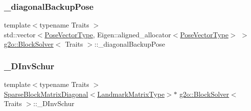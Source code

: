\mbox{\label{classg2o_1_1_block_solver_a3cb6f86c522c2ea26478ad44b7c32f76}} 
\subsubsection{\texorpdfstring{\+\_\+diagonal\+Backup\+Pose}{\_diagonalBackupPose}}
{\footnotesize\ttfamily template$<$typename Traits $>$ \\
std\+::vector$<$\mbox{\hyperlink{classg2o_1_1_block_solver_a65d51b9281e2e2597df05eb00801ee76}{Pose\+Vector\+Type}}, Eigen\+::aligned\+\_\+allocator$<$\mbox{\hyperlink{classg2o_1_1_block_solver_a65d51b9281e2e2597df05eb00801ee76}{Pose\+Vector\+Type}}$>$ $>$ \mbox{\hyperlink{classg2o_1_1_block_solver}{g2o\+::\+Block\+Solver}}$<$ Traits $>$\+::\+\_\+diagonal\+Backup\+Pose\hspace{0.3cm}{\ttfamily [protected]}}

\mbox{\label{classg2o_1_1_block_solver_ad6a1a8f17c8fb854962a8204c79bc981}} 
\subsubsection{\texorpdfstring{\+\_\+\+D\+Inv\+Schur}{\_DInvSchur}}
{\footnotesize\ttfamily template$<$typename Traits $>$ \\
\mbox{\hyperlink{classg2o_1_1_sparse_block_matrix_diagonal}{Sparse\+Block\+Matrix\+Diagonal}}$<$\mbox{\hyperlink{classg2o_1_1_block_solver_afd898a666343291129d37a979e23ded6}{Landmark\+Matrix\+Type}}$>$$\ast$ \mbox{\hyperlink{classg2o_1_1_block_solver}{g2o\+::\+Block\+Solver}}$<$ Traits $>$\+::\+\_\+\+D\+Inv\+Schur\hspace{0.3cm}{\ttfamily [protected]}}

\mbox{\label{classg2o_1_1_block_solver_ab375a5fac964182442f38288bd8a103a}} 
